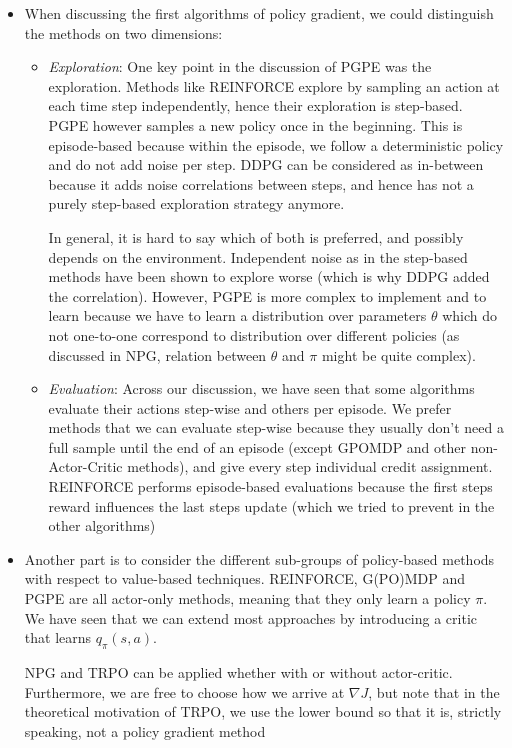 \begin{itemize}
	\item When discussing the first algorithms of policy gradient, we could distinguish the methods on two dimensions:
	\begin{itemize}
		\item \textit{Exploration}: One key point in the discussion of PGPE was the exploration. Methods like REINFORCE explore by sampling an action at each time step independently, hence their exploration is step-based. PGPE however samples a new policy once in the beginning. This is episode-based because within the episode, we follow a deterministic policy and do not add noise per step. DDPG can be considered as in-between because it adds noise correlations between steps, and hence has not a purely step-based exploration strategy anymore. 
		
		In general, it is hard to say which of both is preferred, and possibly depends on the environment. Independent noise as in the step-based methods have been shown to explore worse (which is why DDPG added the correlation). However, PGPE is more complex to implement and to learn because we have to learn a distribution over parameters $\theta$ which do not one-to-one correspond to distribution over different policies (as discussed in NPG, relation between $\theta$ and $\pi$ might be quite complex).
		
		\item \textit{Evaluation}: Across our discussion, we have seen that some algorithms evaluate their actions step-wise and others per episode. We prefer methods that we can evaluate step-wise because they usually don't need a full sample until the end of an episode (except GPOMDP and other non-Actor-Critic methods), and give every step individual credit assignment. REINFORCE performs episode-based evaluations because the first steps reward influences the last steps update (which we tried to prevent in the other algorithms)
	\end{itemize}
	\item Another part is to consider the different sub-groups of policy-based methods with respect to value-based techniques. REINFORCE, G(PO)MDP and PGPE are all actor-only methods, meaning that they only learn a policy $\pi$. We have seen that we can extend most approaches by introducing a critic that learns $q_{\pi}(s,a)$.
	
	NPG and TRPO can be applied whether with or without actor-critic. Furthermore, we are free to choose how we arrive at $\nabla J$, but note that in the theoretical motivation of TRPO, we use the lower bound so that it is, strictly speaking, not a policy gradient method
\end{itemize}